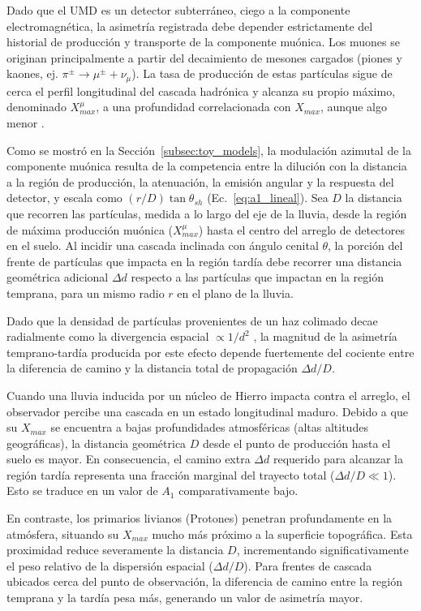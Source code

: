 Dado que el UMD es un detector subterráneo, ciego a la componente electromagnética, la asimetría registrada debe depender estrictamente del historial de producción y transporte de la componente muónica. Los muones se originan principalmente a partir del decaimiento de mesones cargados (piones y kaones, ej. $\pi^{\pm} \rightarrow \mu^{\pm} + \nu_{\mu}$). La tasa de producción de estas partículas sigue de cerca el perfil longitudinal del cascada hadrónica y alcanza su propio máximo, denominado $X_{max}^{\mu}$, a una profundidad correlacionada con $X_{max}$, aunque algo menor \cite{Cazon2012}.

Como se mostró en la Sección~\ref{subsec:toy_models}, la modulación azimutal de la componente muónica resulta de la competencia entre la dilución con la distancia a la región de producción, la atenuación, la emisión angular y la respuesta del detector, y escala como $(r/D)\tan\theta_{sh}$ (Ec.~\ref{eq:a1_lineal}). Sea $D$ la distancia que recorren las partículas, medida a lo largo del eje de la lluvia, desde la región de máxima producción muónica ($X_{max}^{\mu}$) hasta el centro del arreglo de detectores en el suelo. Al incidir una cascada inclinada con ángulo cenital $\theta$, la porción del frente de partículas que impacta en la región tardía debe recorrer una distancia geométrica adicional $\Delta d$ respecto a las partículas que impactan en la región temprana, para un mismo radio $r$ en el plano de la lluvia.

Dado que la densidad de partículas provenientes de un haz colimado decae radialmente como la divergencia espacial  $\propto 1/d^2$ \cite{Cazon2012}, la magnitud de la asimetría temprano-tardía producida por este efecto depende fuertemente del cociente entre la diferencia de camino y la distancia total de propagación $\Delta d / D$.

Cuando una lluvia inducida por un núcleo de Hierro impacta contra el arreglo, el observador percibe una cascada en un estado longitudinal maduro. Debido a que su $X_{max}$ se encuentra a bajas profundidades atmosféricas (altas altitudes geográficas), la distancia geométrica $D$ desde el punto de producción hasta el suelo es mayor. En consecuencia, el camino extra $\Delta d$ requerido para alcanzar la región tardía representa una fracción marginal del trayecto total ($\Delta d / D \ll 1$). Esto se traduce en un valor de $A_1$ comparativamente bajo.

En contraste, los primarios livianos (Protones) penetran profundamente en la atmósfera, situando su $X_{max}$ mucho más próximo a la superficie topográfica. Esta proximidad reduce severamente la distancia $D$, incrementando significativamente el peso relativo de la dispersión espacial ($\Delta d / D$). Para frentes de cascada ubicados cerca del punto de observación, la diferencia de camino entre la región temprana y la tardía pesa más, generando un valor de asimetría mayor.

